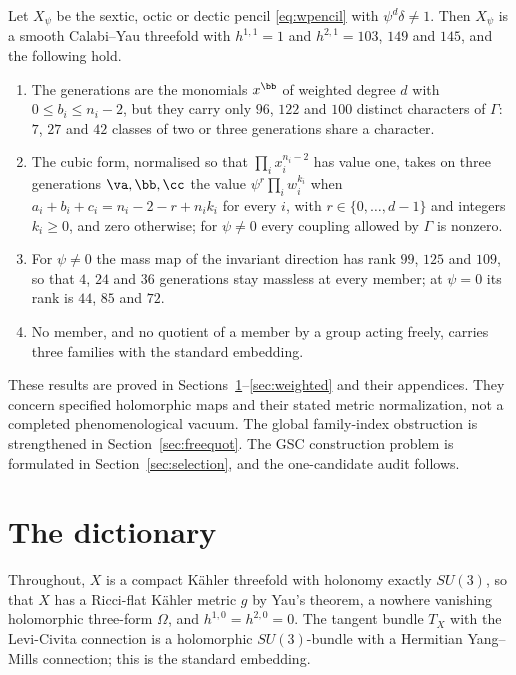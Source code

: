 \begin{theorem}\label{thm:E}
Let $X_\psi$ be the sextic, octic or dectic pencil \eqref{eq:wpencil} with
$\psi^d\delta\ne1$. Then $X_\psi$ is a smooth Calabi--Yau threefold with
$h^{1,1}=1$ and $h^{2,1}=103$, $149$ and $145$, and the following hold.
\begin{enumerate}[label=\textup{(\roman*)},leftmargin=*,itemsep=1pt]
\item The generations are the monomials $x^{\bb}$ of weighted degree $d$
with $0\le b_i\le n_i-2$, but they carry only $96$, $122$ and $100$
distinct characters of $\Gamma$: $7$, $27$ and $42$ classes of two or three
generations share a character.
\item The cubic form, normalised so that $\prod_ix_i^{n_i-2}$ has value
one, takes on three generations $\va,\bb,\cc$ the value
$\psi^r\prod_iw_i^{k_i}$ when $a_i+b_i+c_i=n_i-2-r+n_ik_i$ for every $i$,
with $r\in\{0,\dots,d-1\}$ and integers $k_i\ge0$, and zero otherwise; for
$\psi\ne0$ every coupling allowed by $\Gamma$ is nonzero.
\item For $\psi\ne0$ the mass map of the invariant direction has rank
$99$, $125$ and $109$, so that $4$, $24$ and $36$ generations stay massless
at every member; at $\psi=0$ its rank is $44$, $85$ and $72$.
\item No member, and no quotient of a member by a group acting freely,
carries three families with the standard embedding.
\end{enumerate}
\end{theorem}




These results are proved in Sections~\ref{sec:dictionary}--\ref{sec:weighted}
and their appendices. They concern specified holomorphic maps and
their stated metric normalization, not a completed phenomenological
vacuum. The global family-index obstruction is strengthened in
Section~\ref{sec:freequot}. The GSC construction problem is formulated
in Section~\ref{sec:selection}, and the one-candidate audit follows.


\section{The dictionary}\label{sec:dictionary}

Throughout, $X$ is a compact K\"ahler threefold with holonomy exactly
$SU(3)$, so that $X$ has a Ricci-flat K\"ahler metric $g$ by Yau's
theorem, a nowhere vanishing holomorphic three-form $\Omega$, and
$h^{1,0}=h^{2,0}=0$. The tangent bundle $T_X$ with the Levi-Civita
connection is a holomorphic $SU(3)$-bundle with a Hermitian Yang--Mills
connection; this is the standard embedding.

